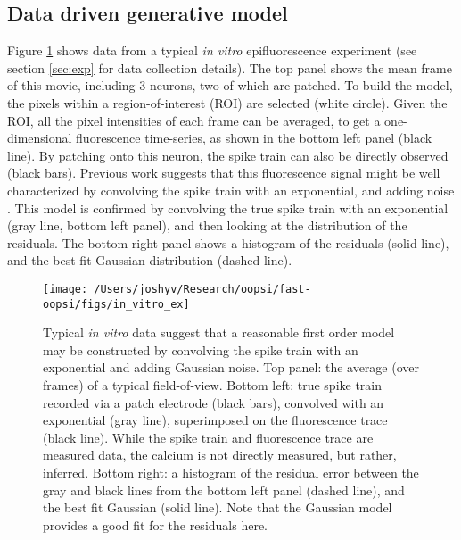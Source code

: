 \subsection{Data driven generative model} \label{sec:model}

Figure \ref{fig:in_vitro_ex} shows data from a typical \emph{in vitro} epifluorescence experiment (see section \ref{sec:exp} for data collection details).  The top panel shows the mean frame of this movie, including 3 neurons, two of which are patched.  To build the model, the pixels within a region-of-interest (ROI) are selected (white circle).  Given the ROI, all the pixel intensities of each frame can be averaged, to get a one-dimensional fluorescence time-series, as shown in the bottom left panel (black line).  By patching onto this neuron, the spike train can also be directly observed (black bars). Previous work suggests that this fluorescence signal might be well characterized by convolving the spike train with an exponential, and adding noise \cite{ImagingManual}.  This model is confirmed by convolving the true spike train with an exponential (gray line, bottom left panel), and then looking at the distribution of the residuals.  The bottom right panel shows a histogram of the residuals (solid line), and the best fit Gaussian distribution (dashed line).


\begin{figure}[h!]
\centering \texttt{[image: /Users/joshyv/Research/oopsi/fast-oopsi/figs/in\_vitro\_ex]}
\caption[data-based model]{Typical \emph{in vitro} data suggest that a reasonable first order model may be constructed by convolving the spike train with an exponential and adding Gaussian noise. Top panel: the average (over frames) of a typical field-of-view.  Bottom left: true spike train recorded via a patch electrode (black bars), convolved with an exponential (gray line), superimposed on the fluorescence trace (black line).  While the spike train and fluorescence trace are measured data, the calcium is not directly measured, but rather, inferred.  Bottom right: a histogram of the residual error between the gray and black lines from the bottom left panel (dashed line), and the best fit Gaussian (solid line). Note that the Gaussian model provides a good fit for the residuals here.} \label{fig:in_vitro_ex}
\end{figure}

